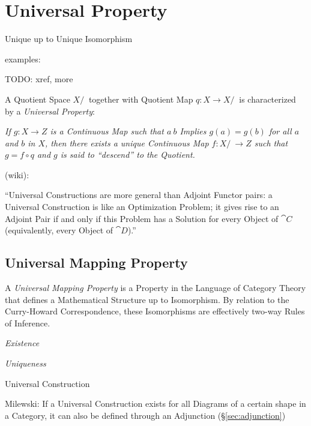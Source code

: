 \section{Universal Property}\label{sec:universal_property}

Unique up to Unique Isomorphism

examples:

TODO: xref, more

A Quotient Space $X/~$ together with Quotient Map $q : X \rightarrow X/~$ is
characterized by a \emph{Universal Property}:

\emph{If $g : X \rightarrow Z$ is a Continuous Map such that $a ~ b$ Implies $g(a)
  = g(b)$ for all $a$ and $b$ in $X$, then there exists a unique Continuous Map
  $f : X/~ \rightarrow Z$ such that $g = f \circ q$ and $g$ is said to
  ``descend'' to the Quotient.}

(wiki):

``Universal Constructions are more general than Adjoint Functor pairs: a
Universal Construction is like an Optimization Problem; it gives rise to an
Adjoint Pair if and only if this Problem has a Solution for every Object of
$\cat{C}$ (equivalently, every Object of $\cat{D}$).''



\subsection{Universal Mapping Property}
\label{sec:universal_mapping_property}

A \emph{Universal Mapping Property} is a Property in the Language of
Category Theory that defines a Mathematical Structure up to
Isomorphism. By relation to the Curry-Howard Correspondence, these
Isomorphisms are effectively two-way Rules of Inference.

\emph{Existence}

\emph{Uniqueness}

Universal Construction

Milewski: If a Universal Construction exists for all Diagrams of a
certain shape in a Category, it can also be defined through an
Adjunction (\S\ref{sec:adjunction})



